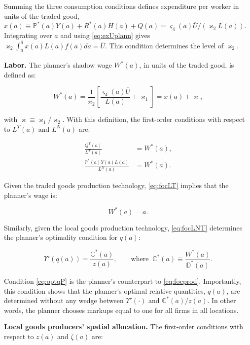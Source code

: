Summing the three consumption conditions defines expenditure per worker in units of the traded good, $x(a) \equiv \mathbb{P}^*(a) Y(a) + R^*(a) H(a) + Q(a) = \varsigma_4(a) \overline{U}/(\varkappa_2 L(a))$. Integrating over $a$ and using \eqref{eq:exUplann} gives $\varkappa_2 \int_{\underline{a}}^{\overline{a}} x(a) L(a) f(a) da = \overline{U}$. This condition determines the level of $\varkappa_2$.

\noindent \textbf{Labor.} The planner's shadow wage $W^*(a)$, in units of the traded good, is defined as:

\begin{equation} \label{eq:shadowW}
	 W^*(a) = \frac{1}{\varkappa_2}\left[\frac{\varsigma_4(a) \overline{U}}{L(a)} + \varkappa_1\right] = x(a) + \varkappa,
\end{equation}

with $\varkappa \equiv \varkappa_1/\varkappa_2$. With this definition, the first-order conditions with respect to $L^T(a)$ and $L^{N}(a)$ are:

\begin{align}
 \frac{Q^T(a)}{L^T(a)} & = W^*(a), \label{eq:focLT} \\
 \frac{\mathbb{P}^*(a) Y(a) L(a)}{L^{N}(a)} & = W^*(a). \label{eq:focLNT}
\end{align}

Given the traded goods production technology, \eqref{eq:focLT} implies that the planner's wage is:

\begin{equation}\label{eq:plannzeroprof}
	W^*(a) = a.
\end{equation}

Similarly, given the local goods production technology, \eqref{eq:focLNT} determines the planner's optimality condition for $q(a)$:

\begin{equation}\label{eq:optqP}
	\Upsilon'(q(a)) = \frac{\mathbb{C}^*(a)}{z(a)}, \qquad \text{where} \;\; \mathbb{C}^*(a) \equiv \frac{W^*(a)}{\mathbb{D}^*(a)}.
\end{equation}

Condition \eqref{eq:optqP} is the planner's counterpart to \eqref{eq:focprod}. Importantly, this condition shows that the planner's optimal relative quantities, $q(a)$, are determined without any wedge between $\Upsilon'(\cdot)$ and $\mathbb{C}^*(a)/z(a)$. In other words, the planner chooses markups equal to one for all firms in all locations.

\noindent \textbf{Local goods producers' spatial allocation.} The first-order conditions with respect to $z(a)$ and $\zeta(a)$ are:


